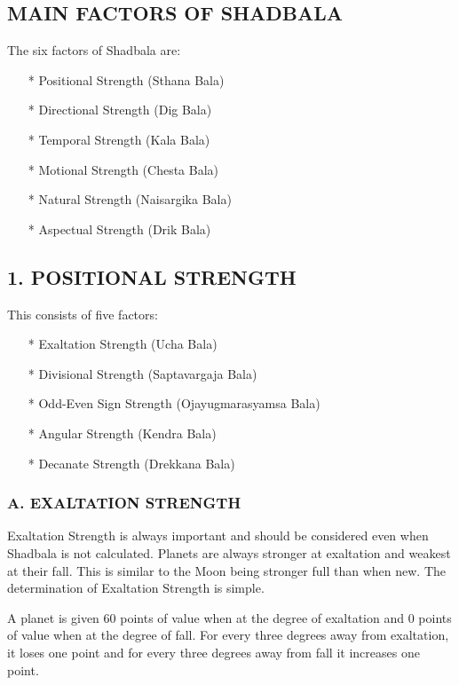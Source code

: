  

\subsection{MAIN FACTORS OF SHADBALA}

 

The six factors of Shadbala are:

\begin{enumerate}
\item[*] Positional Strength (Sthana Bala)
\item[*] Directional Strength (Dig Bala)
\item[*] Temporal Strength (Kala Bala)
\item[*] Motional Strength (Chesta Bala)
\item[*] Natural Strength (Naisargika Bala)
\item[*] Aspectual Strength (Drik Bala)
\end{enumerate} 

 


\subsection{1. POSITIONAL STRENGTH}
This consists of five factors:

 

\begin{enumerate}
\item[*] Exaltation Strength (Ucha Bala)
\item[*] Divisional Strength (Saptavargaja Bala)
\item[*] Odd-Even Sign Strength (Ojayugmarasyamsa Bala)
\item[*] Angular Strength (Kendra Bala)
\item[*] Decanate Strength (Drekkana Bala)
\end{enumerate} 

\subsubsection{A. EXALTATION STRENGTH}


 

Exaltation Strength is always important and should be considered even when Shadbala is not calculated. Planets are always stronger at exaltation and weakest at their fall. This is similar to the Moon being stronger full than when new. The determination of Exaltation Strength is simple.

A planet is given 60 points of value when at the degree of exaltation and 0 points of value when at the degree of fall.
For every three degrees away from exaltation, it loses one point and for every three degrees away from fall it increases one point.
 

